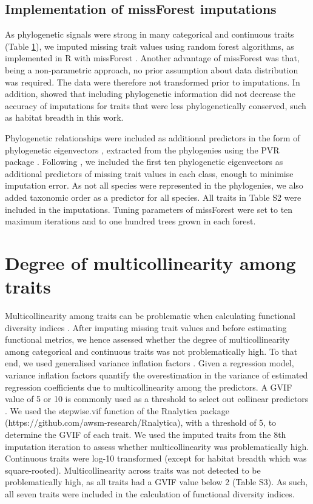 \subsection{Implementation of missForest imputations}
As phylogenetic signals were strong in many categorical and continuous traits (Table \ref{}), we imputed missing trait values using random forest algorithms, as implemented in R with missForest \citep{Stekhoven2012, Stekhoven2016}. Another advantage of missForest was that, being a non-parametric approach, no prior assumption about data distribution was required. The data were therefore not transformed prior to imputations. In addition, \citet{Penone2014} showed that including phylogenetic information did not decrease the accuracy of imputations for traits that were less phylogenetically conserved, such as habitat breadth in this work. 

Phylogenetic relationships were included as additional predictors in the form of phylogenetic eigenvectors \citep{DinizFilho2012}, extracted from the phylogenies using the PVR package \citep{Santos2018}. Following \citet{Penone2014}, we included the first ten phylogenetic eigenvectors as additional predictors of missing trait values in each class, enough to minimise imputation error. As not all species were represented in the phylogenies, we also added taxonomic order as a predictor for all species. All traits in Table S2 were included in the imputations. Tuning parameters of missForest were set to ten maximum iterations and to one hundred trees grown in each forest. 

\section{Degree of multicollinearity among traits}
Multicollinearity among traits can be problematic when calculating functional diversity indices \citep{Cadotte2011}. After imputing missing trait values and before estimating functional metrics, we hence assessed whether the degree of multicollinearity among categorical and continuous traits was not problematically high. To that end, we used generalised variance inflation factors \citep{Fox1992}. Given a regression model, variance inflation factors quantify the overestimation in the variance of estimated regression coefficients due to multicollinearity among the predictors. A GVIF value of 5 or 10 is commonly used as a threshold to select out collinear predictors \citep{Dormann2013}. We used the stepwise.vif function of the Rnalytica package (https://github.com/awsm-research/Rnalytica), with a threshold of 5, to determine the GVIF of each trait. We used the imputed traits from the 8th imputation iteration to assess whether multicollinearity was problematically high. Continuous traits were log-10 transformed (except for habitat breadth which was square-rooted). Multicollinearity across traits was not detected to be problematically high, as all traits had a GVIF value below 2 (Table S3). As such, all seven traits were included in the calculation of functional diversity indices.

